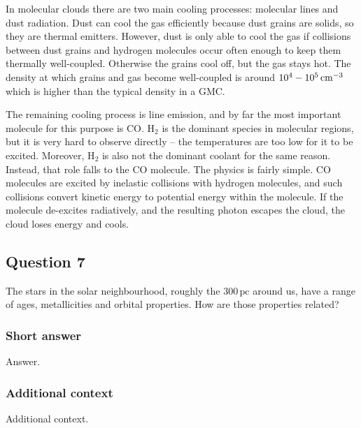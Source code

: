 \documentclass[a4paper,10pt]{article}
\begin{document}
{\noindent}In molecular clouds there are two main cooling processes: molecular lines and dust radiation. Dust can cool the gas efficiently because dust grains are solids, so they are thermal emitters. However, dust is only able to cool the gas if collisions between dust grains and hydrogen molecules occur often enough to keep them thermally well-coupled. Otherwise the grains cool off, but the gas stays hot. The density at which grains and gas become well-coupled is around $10^4-10^5\,{\rm cm^{-3}}$ which is higher than the typical density in a GMC.

{\noindent}The remaining cooling process is line emission, and by far the most important molecule for this purpose is CO. H$_2$ is the dominant species in molecular regions, but it is very hard to observe directly -- the temperatures are too low for it to be excited. Moreover, H$_2$ is also not the dominant coolant for the same reason. Instead, that role falls to the CO molecule. The physics is fairly simple. CO molecules are excited by inelastic collisions with hydrogen molecules, and such collisions convert kinetic energy to potential energy within the molecule. If the molecule de-excites radiatively, and the resulting photon escapes the cloud, the cloud loses energy and cools.



\newpage
\subsection{Question 7}

The stars in the solar neighbourhood, roughly the $300\,\mathrm{pc}$ around us, have a range of ages, metallicities and orbital properties. How are those properties related?

\subsubsection{Short answer}

Answer.

\subsubsection{Additional context}

Additional context.

\end{document}
